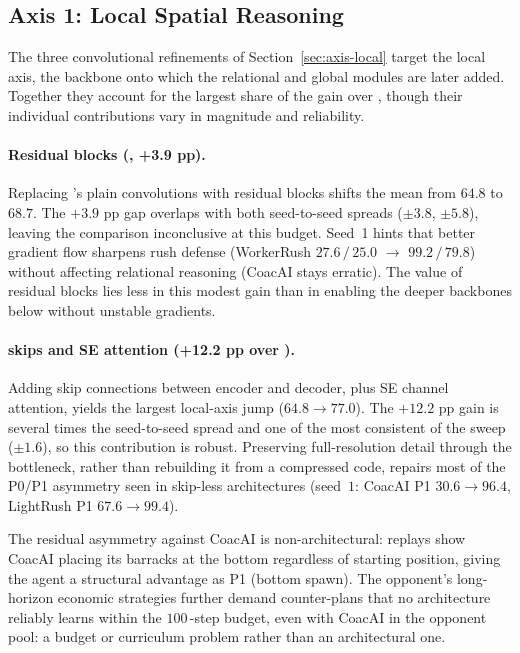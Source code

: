 \subsection{Axis 1: Local Spatial Reasoning}

The three convolutional refinements of Section~\ref{sec:axis-local} target the local axis, the backbone onto which the relational and global modules are later added. Together they account for the largest share of the gain over , though their individual contributions vary in magnitude and reliability.

\paragraph*{Residual blocks (, +3.9 pp).}

Replacing 's plain convolutions with  residual blocks shifts the mean from $64.8$ to $68.7$. The $+3.9$ pp gap overlaps with both seed-to-seed spreads ($\pm$3.8, $\pm5.8$), leaving the comparison inconclusive at this budget. Seed~1 hints that better gradient flow sharpens rush defense (WorkerRush $27.6\,/\,25.0$ $\to$ $99.2\,/\,79.8$) without affecting relational reasoning (CoacAI stays erratic). The value of residual blocks lies less in this modest gain than in enabling the deeper backbones below without unstable gradients.

\paragraph*{ skips and SE attention (+12.2 pp over ).}

Adding skip connections between encoder and decoder, plus SE channel attention, yields the largest local-axis jump ($64.8 \to 77.0$). The $+12.2$ pp gain is several times the seed-to-seed spread and one of the most consistent of the sweep ($\pm1.6$), so this contribution is robust. Preserving full-resolution detail through the bottleneck, rather than rebuilding it from a compressed code, repairs most of the P0/P1 asymmetry seen in skip-less architectures (seed~$1$: CoacAI P1 $30.6 \to 96.4$, LightRush P1 $67.6 \to 99.4$).

The residual asymmetry against CoacAI is non-architectural: replays show CoacAI placing its barracks at the bottom regardless of starting position, giving the agent a structural advantage as P1 (bottom spawn). The opponent's long-horizon economic strategies further demand counter-plans that no architecture reliably learns within the $100$\,-step budget, even with CoacAI in the opponent pool: a budget or curriculum problem rather than an architectural one.

